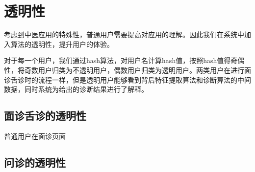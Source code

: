 \section{透明性}
考虑到中医应用的特殊性，普通用户需要提高对应用的理解。因此我们在系统中加入算法的透明性，提升用户的体验。

对于每一个用户，我们通过hash算法，对用户名计算hash值，按照hash值得奇偶性，将奇数用户归类为不透明用户，偶数用户归类为透明用户。两类用户在进行面诊舌诊时的流程一样，但是透明用户能够看到背后特征提取算法和诊断算法的中间数据，同时系统为给出的诊断结果进行了解释。

\subsection{面诊舌诊的透明性}
普通用户在面诊页面

\subsection{问诊的透明性}

